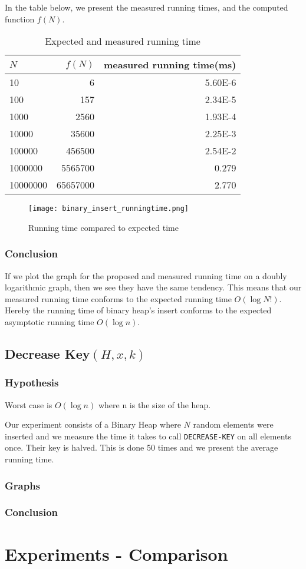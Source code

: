 \documentclass[a4paper,oneside,11pt]{article}
\begin{document}
In the table below, we present the measured running times, and the computed function $f(N)$.
\begin{table}
  \begin{center}
    \begin{tabular}{l|r|r}
      $N$ & $f(N)$ & measured running time(ms)\\
      \hline
      10       & 6         & \num{5.60E-6}\\
      100      & 157       & \num{2.34E-5}\\
      1000     & 2560      & \num{1.93E-4}\\
      10000    & 35600     & \num{2.25E-3}\\
      100000   & 456500    & \num{2.54E-2}\\
      1000000  & 5565700   & \num{0.279}\\
      10000000 & 65657000  & \num{2.770}
    \end{tabular}
    \caption{Expected and measured running time}
  \end{center}
\end{table}
\begin{figure}
  \texttt{[image: binary\_insert\_runningtime.png]}
  \caption{Running time compared to expected time}
\end{figure}

\subsubsection*{Conclusion}
If we plot the graph for the proposed and measured running time on a doubly logarithmic graph, then we see they have the same tendency.
This means that our measured running time conforms to the expected running time $O(\log N!)$. Hereby the running time of binary heap's insert conforms to the expected asymptotic running time $O(\log n)$.

\subsection*{Decrease Key$(H,x,k)$}

\subsubsection*{Hypothesis}
Worst case is $O(\log n)$ where n is the size of the heap.

Our experiment consists of a Binary Heap where $N$ random elements were inserted and we measure the time it takes to call \texttt{DECREASE-KEY} on all elements once. Their key is halved. This is done 50 times and we present the average running time.

\subsubsection*{Graphs}

\subsubsection*{Conclusion}

\section*{Experiments - Comparison}
\end{document}
